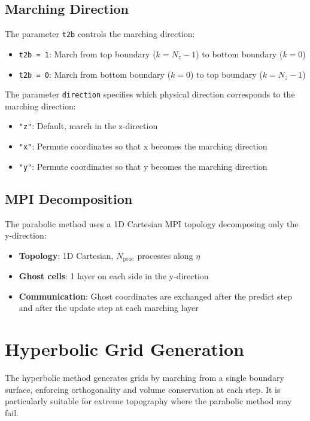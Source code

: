 \documentclass[11pt,a4paper]{report}
\begin{document}
\section{Marching Direction}

The parameter \texttt{t2b} controls the marching direction:
\begin{itemize}
    \item \texttt{t2b = 1}: March from top boundary ($k = N_z-1$) to bottom boundary ($k = 0$)
    \item \texttt{t2b = 0}: March from bottom boundary ($k = 0$) to top boundary ($k = N_z-1$)
\end{itemize}

The parameter \texttt{direction} specifies which physical direction corresponds to the marching direction:
\begin{itemize}
    \item \texttt{"z"}: Default, march in the z-direction
    \item \texttt{"x"}: Permute coordinates so that x becomes the marching direction
    \item \texttt{"y"}: Permute coordinates so that y becomes the marching direction
\end{itemize}

\section{MPI Decomposition}

The parabolic method uses a 1D Cartesian MPI topology decomposing only the y-direction:
\begin{itemize}
    \item \textbf{Topology}: 1D Cartesian, $N_{\text{proc}}$ processes along $\eta$
    \item \textbf{Ghost cells}: 1 layer on each side in the y-direction
    \item \textbf{Communication}: Ghost coordinates are exchanged after the predict step and after the update step at each marching layer
\end{itemize}

\chapter{Hyperbolic Grid Generation}

The hyperbolic method generates grids by marching from a single boundary surface, enforcing orthogonality and volume conservation at each step. It is particularly suitable for extreme topography where the parabolic method may fail.
\end{document}
